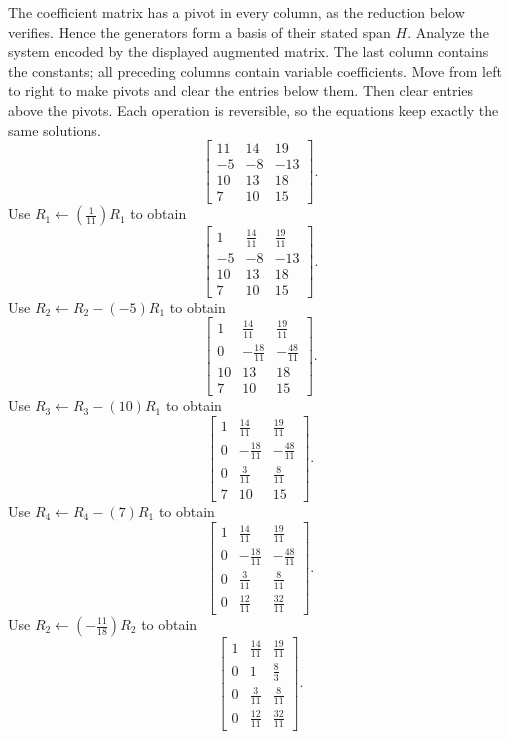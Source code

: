 The coefficient matrix has a pivot in every column, as the reduction below verifies. Hence the generators form a basis of their stated span $H$.
\goal Analyze the system encoded by the displayed augmented matrix. The last column contains the constants; all preceding columns contain variable coefficients.
\idea Move from left to right to make pivots and clear the entries below them. Then clear entries above the pivots. Each operation is reversible, so the equations keep exactly the same solutions.
\[ \left[\begin{array}{rr|r}11&14&19\\-5&-8&-13\\10&13&18\\7&10&15\end{array}\right].\]
Use $R_{1}\leftarrow(\frac{1}{11})R_{1}$ to obtain
\[ \left[\begin{array}{rr|r}1&\frac{14}{11}&\frac{19}{11}\\-5&-8&-13\\10&13&18\\7&10&15\end{array}\right].\]
Use $R_{2}\leftarrow R_{2}-(-5)R_{1}$ to obtain
\[ \left[\begin{array}{rr|r}1&\frac{14}{11}&\frac{19}{11}\\0&- \frac{18}{11}&- \frac{48}{11}\\10&13&18\\7&10&15\end{array}\right].\]
Use $R_{3}\leftarrow R_{3}-(10)R_{1}$ to obtain
\[ \left[\begin{array}{rr|r}1&\frac{14}{11}&\frac{19}{11}\\0&- \frac{18}{11}&- \frac{48}{11}\\0&\frac{3}{11}&\frac{8}{11}\\7&10&15\end{array}\right].\]
Use $R_{4}\leftarrow R_{4}-(7)R_{1}$ to obtain
\[ \left[\begin{array}{rr|r}1&\frac{14}{11}&\frac{19}{11}\\0&- \frac{18}{11}&- \frac{48}{11}\\0&\frac{3}{11}&\frac{8}{11}\\0&\frac{12}{11}&\frac{32}{11}\end{array}\right].\]
Use $R_{2}\leftarrow(- \frac{11}{18})R_{2}$ to obtain
\[ \left[\begin{array}{rr|r}1&\frac{14}{11}&\frac{19}{11}\\0&1&\frac{8}{3}\\0&\frac{3}{11}&\frac{8}{11}\\0&\frac{12}{11}&\frac{32}{11}\end{array}\right].\]
